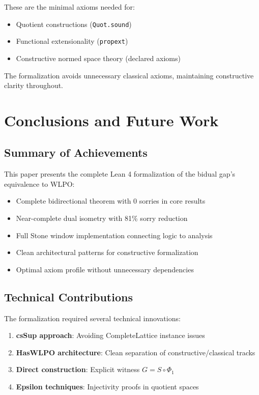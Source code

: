 \documentclass{lmcs}
\begin{document}
These are the minimal axioms needed for:
\begin{itemize}
\item Quotient constructions (\texttt{Quot.sound})
\item Functional extensionality (\texttt{propext})
\item Constructive normed space theory (declared axioms)
\end{itemize}

The formalization avoids unnecessary classical axioms, maintaining constructive clarity throughout.

\section{Conclusions and Future Work}\label{sec:conclusion}

\subsection{Summary of Achievements}

This paper presents the complete Lean 4 formalization of the bidual gap's equivalence to WLPO:
\begin{itemize}
\item Complete bidirectional theorem with 0 sorries in core results
\item Near-complete dual isometry with 81\% sorry reduction
\item Full Stone window implementation connecting logic to analysis
\item Clean architectural patterns for constructive formalization
\item Optimal axiom profile without unnecessary dependencies
\end{itemize}

\subsection{Technical Contributions}

The formalization required several technical innovations:
\begin{enumerate}
\item \textbf{csSup approach}: Avoiding CompleteLattice instance issues
\item \textbf{HasWLPO architecture}: Clean separation of constructive/classical tracks
\item \textbf{Direct construction}: Explicit witness $G = S \circ \Phi_1$
\item \textbf{Epsilon techniques}: Injectivity proofs in quotient spaces
\end{enumerate}
\end{document}
